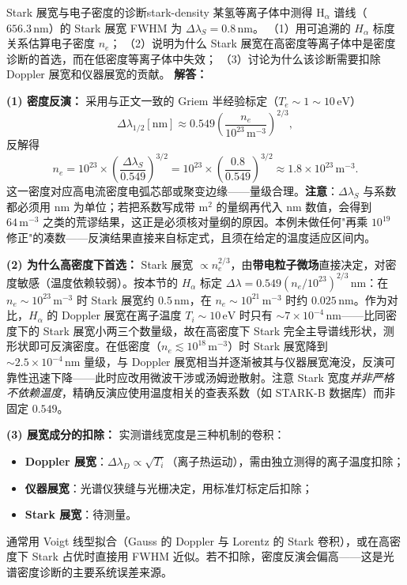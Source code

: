 \begin{example}{Stark 展宽与电子密度的诊断}{stark-density}
某氢等离子体中测得 $\mathrm{H}_\alpha$ 谱线（$656.3\,\mathrm{nm}$）的 Stark 展宽 FWHM 为 $\Delta\lambda_S = 0.8\,\mathrm{nm}$。
（1）用可追溯的 $H_\alpha$ 标度关系估算电子密度 $n_e$；
（2）说明为什么 Stark 展宽在高密度等离子体中是密度诊断的首选，而在低密度等离子体中失效；
（3）讨论为什么该诊断需要扣除 Doppler 展宽和仪器展宽的贡献。
\tcblower
\textbf{解答：}

\textbf{(1) 密度反演：} 采用与正文一致的 Griem 半经验标定（$T_e\sim1\sim10\,\mathrm{eV}$）
\[
\Delta\lambda_{1/2}[\mathrm{nm}] \approx 0.549\left(\frac{n_e}{10^{23}\,\mathrm{m^{-3}}}\right)^{2/3},
\]
反解得
\[
n_e = 10^{23}\times\left(\frac{\Delta\lambda_S}{0.549}\right)^{3/2}
= 10^{23}\times\left(\frac{0.8}{0.549}\right)^{3/2}
\approx 1.8\times10^{23}\,\mathrm{m^{-3}}.
\]
这一密度对应高电流密度电弧芯部或聚变边缘——量级合理。\textbf{注意}：$\Delta\lambda_S$ 与系数都必须用 $\mathrm{nm}$ 为单位；若把系数写成带 $\mathrm{m^2}$ 的量纲再代入 $\mathrm{nm}$ 数值，会得到 $64\,\mathrm{m^{-3}}$ 之类的荒谬结果，这正是必须核对量纲的原因。本例未做任何"再乘 $10^{19}$ 修正"的凑数——反演结果直接来自标定式，且须在给定的温度适应区间内。

\textbf{(2) 为什么高密度下首选：} Stark 展宽 $\propto n_e^{2/3}$，由\textbf{带电粒子微场}直接决定，对密度敏感（温度依赖较弱）。按本节的 $H_\alpha$ 标定 $\Delta\lambda=0.549(n_e/10^{23})^{2/3}\,\mathrm{nm}$：在 $n_e\sim10^{23}\,\mathrm{m^{-3}}$ 时 Stark 展宽约 $0.5\,\mathrm{nm}$，在 $n_e\sim10^{21}\,\mathrm{m^{-3}}$ 时约 $0.025\,\mathrm{nm}$。作为对比，$H_\alpha$ 的 Doppler 展宽在离子温度 $T_i\sim10\,\mathrm{eV}$ 时只有 $\sim7\times10^{-4}\,\mathrm{nm}$——比同密度下的 Stark 展宽小两三个数量级，故在高密度下 Stark 完全主导谱线形状，测形状即可反演密度。在低密度（$n_e\lesssim10^{18}\,\mathrm{m^{-3}}$）时 Stark 展宽降到 $\sim2.5\times10^{-4}\,\mathrm{nm}$ 量级，与 Doppler 展宽相当并逐渐被其与仪器展宽淹没，反演可靠性迅速下降——此时应改用微波干涉或汤姆逊散射。注意 Stark 宽度\emph{并非严格不依赖温度}，精确反演应使用温度相关的查表系数（如 STARK-B 数据库）而非固定 $0.549$。

\textbf{(3) 展宽成分的扣除：} 实测谱线宽度是三种机制的卷积：
\begin{itemize}[leftmargin=*,itemsep=0pt]
\item \textbf{Doppler 展宽}：$\Delta\lambda_D \propto \sqrt{T_i}$（离子热运动），需由独立测得的离子温度扣除；
\item \textbf{仪器展宽}：光谱仪狭缝与光栅决定，用标准灯标定后扣除；
\item \textbf{Stark 展宽}：待测量。
\end{itemize}
通常用 Voigt 线型拟合（Gauss 的 Doppler 与 Lorentz 的 Stark 卷积），或在高密度下 Stark 占优时直接用 FWHM 近似。若不扣除，密度反演会偏高——这是光谱密度诊断的主要系统误差来源。
\end{example}

